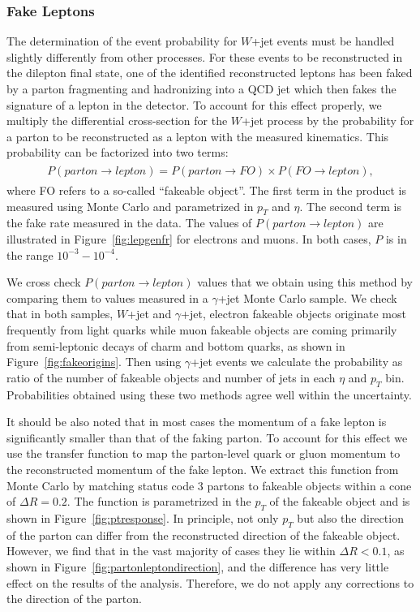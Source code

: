 \documentclass{cmspaper}
\begin{document}
\subsubsection{Fake Leptons}
\label{sec:FakeLeptons}
The determination of the event probability for $W$+jet events must be handled slightly differently from other processes.
For these events to be reconstructed in the dilepton final state, one of the identified reconstructed leptons has been
faked by a parton fragmenting and hadronizing into a QCD jet which then fakes the signature of a lepton in the detector. 
To account for this effect properly, we multiply the differential cross-section for the $W$+jet process by the 
probability for a parton to be reconstructed as a lepton with the measured kinematics. This probability can be 
factorized into two terms:
\begin{eqnarray}
\begin{array}{lcl}
P(parton\rightarrow lepton)=P(parton\rightarrow FO) \times P(FO\rightarrow lepton),
\end{array} 
\end{eqnarray} 
where FO refers to a so-called ``fakeable object''. The first term in the product is measured using Monte Carlo and 
parametrized in $p_{T}$ and $\eta$. The second term is the fake rate measured in the data. The values 
of $P(parton \rightarrow lepton)$ are illustrated in Figure~\ref{fig:lepgenfr} for electrons and muons.
In both cases, $P$ is in the range $10^{-3}-10^{-4}$.

We cross check $P(parton \rightarrow lepton)$ values that we obtain using this method by comparing them to values 
measured in a $\gamma$+jet Monte Carlo sample.  We check that in both samples, $W$+jet and  $\gamma$+jet,
electron fakeable objects originate most frequently from light quarks while muon fakeable objects are coming primarily
from semi-leptonic decays of charm and bottom quarks, as shown in Figure~\ref{fig:fakeorigins}.
Then using  $\gamma$+jet events we calculate the probability as ratio of the number of fakeable objects and number of jets in each $\eta$ and $p_{T}$ bin.
Probabilities obtained using these two methods agree well within the uncertainty. 

It should be also noted that in most cases the momentum of a fake lepton is significantly smaller than that of the faking parton.
To account for this effect we use the transfer function to map the parton-level quark or gluon momentum to the reconstructed
momentum of the fake lepton.
We extract this function from Monte Carlo by matching status code 3 partons to fakeable objects within a
cone of $\Delta R=0.2$.
The function is parametrized in the $p_{T}$ of the fakeable object and is shown in Figure~\ref{fig:ptresponse}.
In principle, not only $p_{T}$ but also the direction of the parton can differ from the reconstructed direction of the fakeable object.
However, we find that in the vast majority of cases they lie within $\Delta R<0.1$, as shown in Figure~\ref{fig:partonleptondirection},
and the difference has very little effect on the results of the analysis. Therefore, we do not apply any corrections to the direction
of the parton.
\end{document}
